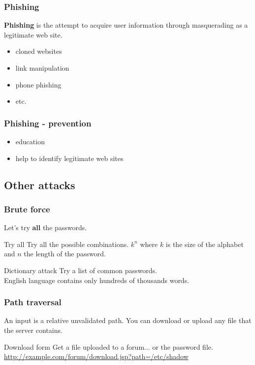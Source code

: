 \begin{frame}
\frametitle{Phishing}
\textbf{Phishing} is the attempt to acquire user information through
masquerading as a legitimate web site.
\begin{itemize}
\item cloned websites
\item link manipulation
\item phone phishing
\item etc.
\end{itemize}
\end{frame}

\begin{frame}
\frametitle{Phishing - prevention}
\begin{itemize}
\item education
\item help to identify legitimate web sites
\end{itemize}
\end{frame}

\subsection{Other attacks}

\begin{frame}
\frametitle{Brute force}
Let's try \textbf{all} the passwords.
\begin{block}{Try all}
Try all the possible combinations.
\newline
$k^n$ where $k$ is the size of the alphabet and $n$ the length of the
password.
\end{block}
\begin{block}{Dictionary attack}
Try a list of common passwords.
\\ English language contains only hundreds of thousands words.
\end{block}
\end{frame}


\begin{frame}
\frametitle{Path traversal}
An input is a relative unvalidated path.
You can download or upload any file that the server contains.
\begin{exampleblock}{Download form}
Get a file uploaded to a forum... or the password file.
\newline
\url{http://example.com/forum/download.jsp?path=/etc/shadow}
\end{exampleblock}
\end{frame}

